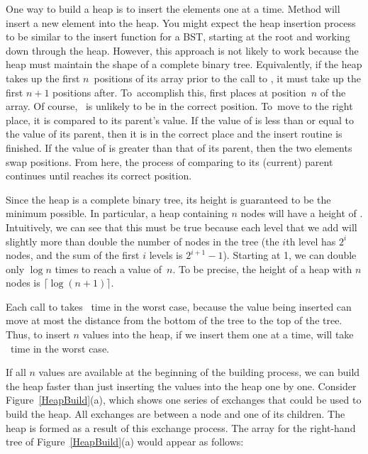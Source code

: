 One way to build a heap is to insert the elements one at a time.
Method  will insert a new element  into
the heap.
You might expect the heap insertion process to be similar to the
insert function for a BST, starting at the root and working down
through the heap.
However, this approach is not likely to work because the heap must
maintain the shape of a complete binary tree.
Equivalently, if the heap takes up the first
\(n\)~positions of its array prior to the call to , it must
take up the first \(n+1\) positions after.
To~accomplish this,  first places  at
position~\(n\) of the array.
Of course, ~is unlikely to be in the correct position.
To~move  to the right place, it is compared to its parent's
value.
If the value of  is less than or equal to the value of its
parent, then it is in the correct place and the insert routine is
finished.
If the value of  is greater than that of its parent, then the
two elements swap positions.
From here, the process of comparing  to its (current) parent
continues until  reaches its correct position.

Since the heap is a complete binary tree, its height is guaranteed to
be the minimum possible.
In particular, a heap containing \(n\) nodes will have a height of
\Thetalogn.
Intuitively, we can see that this must be true because each level that
we add will slightly more than double the number of nodes in the tree
(the \(i\)th level has \(2^i\) nodes, and the sum of the first \(i\)
levels is \(2^{i+1}-1\)).
Starting at 1, we can double only \(\log n\) times to reach a value
of~\(n\).
To be precise, the height of a heap with \(n\) nodes is
\(\lceil\log (n+1)\rceil.\)

Each call to  takes \Thetalogn\ time in the worst case,
because the value being inserted can move at most the distance from the
bottom of the tree to the top of the tree.
Thus, to insert \(n\) values into the heap, if we insert them 
one at a time, will take \Thetanlogn\ time in the worst case.

If all \(n\) values are available at the beginning of the building
process, we can build the heap faster than just
inserting the values into the heap one by one.
Consider Figure~\ref{HeapBuild}(a), which shows one series of
exchanges that could be used to build the heap.
All exchanges are between a node and one of its children.
The heap is formed as a result of this exchange process.
The array for the right-hand tree of Figure~\ref{HeapBuild}(a)
would appear as follows:
\vspace{-\medskipamount}

